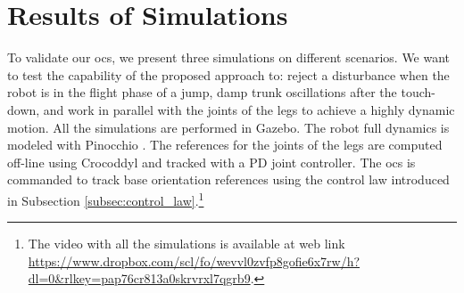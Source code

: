 \documentclass[sensors,article,submit,pdftex,moreauthors]{Definitions/mdpi}
\begin{document}
\section{Results of Simulations}
\label{sec:simulations}
To validate our \gls{ocs}, we present three simulations on different scenarios. We want to test the capability of the proposed approach to: 
reject a disturbance when the robot is in the flight phase of a jump, damp trunk oscillations after the touch-down, 
and work in parallel with the joints of the legs to achieve a highly dynamic motion. 
All the simulations are performed in Gazebo. The robot full dynamics is modeled with Pinocchio \cite{carpentier2019pinocchio}. The references for the joints of the legs are computed off-line using Crocoddyl \cite{mastalli2020crocoddyl} and tracked with a PD joint controller. The \gls{ocs} is commanded to 
track base orientation references using the control law introduced in Subsection \ref{subsec:control_law}.\footnote{The video with all the simulations is available at web link \url{https://www.dropbox.com/scl/fo/wevvl0zvfp8gofie6x7rw/h?dl=0&rlkey=pap76cr813a0skrvrxl7qgrb9}.}
\end{document}

